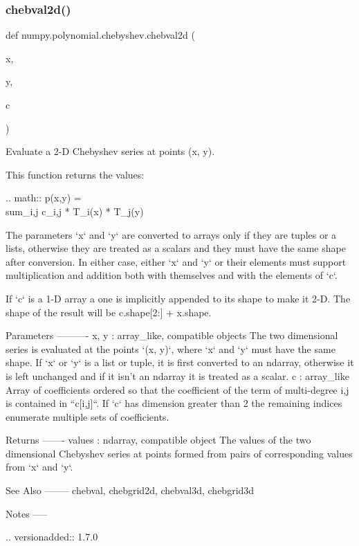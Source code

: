 \subsubsection{\texorpdfstring{chebval2d()}{chebval2d()}}
{\footnotesize\ttfamily def numpy.\+polynomial.\+chebyshev.\+chebval2d (\begin{DoxyParamCaption}\item[{}]{x,  }\item[{}]{y,  }\item[{}]{c }\end{DoxyParamCaption})}

\begin{DoxyVerb}Evaluate a 2-D Chebyshev series at points (x, y).

This function returns the values:

.. math:: p(x,y) = \\sum_{i,j} c_{i,j} * T_i(x) * T_j(y)

The parameters `x` and `y` are converted to arrays only if they are
tuples or a lists, otherwise they are treated as a scalars and they
must have the same shape after conversion. In either case, either `x`
and `y` or their elements must support multiplication and addition both
with themselves and with the elements of `c`.

If `c` is a 1-D array a one is implicitly appended to its shape to make
it 2-D. The shape of the result will be c.shape[2:] + x.shape.

Parameters
----------
x, y : array_like, compatible objects
    The two dimensional series is evaluated at the points `(x, y)`,
    where `x` and `y` must have the same shape. If `x` or `y` is a list
    or tuple, it is first converted to an ndarray, otherwise it is left
    unchanged and if it isn't an ndarray it is treated as a scalar.
c : array_like
    Array of coefficients ordered so that the coefficient of the term
    of multi-degree i,j is contained in ``c[i,j]``. If `c` has
    dimension greater than 2 the remaining indices enumerate multiple
    sets of coefficients.

Returns
-------
values : ndarray, compatible object
    The values of the two dimensional Chebyshev series at points formed
    from pairs of corresponding values from `x` and `y`.

See Also
--------
chebval, chebgrid2d, chebval3d, chebgrid3d

Notes
-----

.. versionadded:: 1.7.0\end{DoxyVerb}
 \mbox{\label{namespacenumpy_1_1polynomial_1_1chebyshev_a12bb46a428c4f1b3389bd522b0bd0dbc}} 
